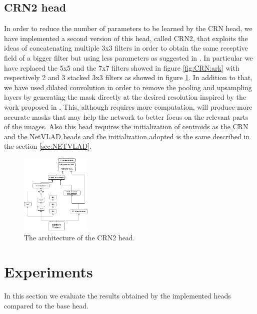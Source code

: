 \documentclass[10pt,twocolumn,letterpaper]{article}
\begin{document}
\subsection{CRN2 head}
In order to reduce the number of parameters to be learned by the CRN head, we have implemented a second version of this head,
called CRN2, that exploits the ideas of concatenating multiple 3x3 filters in order to obtain the same receptive field of a
bigger filter but using less parameters as suggested in \cite{VGG}. In particular we have replaced the 5x5 and the 7x7 filters showed in figure \ref{fig:CRN:ark}
with respectively 2 and 3 stacked 3x3 filters as showed in figure \ref{fig:CRN2:ark}. In addition to that, we have used dilated convolution
in order to remove the pooling and upsampling layers by generating the mask directly at the desired resolution inspired by the work 
proposed in \cite{atrous}. This, although requires 
more computation, will produce more accurate masks that may help the network to better focus on the relevant parts of the images.
Also this head requires the initialization of centroids as the CRN and the NetVLAD heads
and the initialization adopted is the same described in the section \ref{sec:NETVLAD}.

\begin{figure}
	\centering
	\includegraphics[width=0.3\textwidth]{img/CRN2.png}
	\caption{The architecture of the CRN2 head.}
	\label{fig:CRN2:ark}
\end{figure}

\section{Experiments}
In this section we evaluate the results obtained by the implemented heads compared to the base head.
\end{document}
